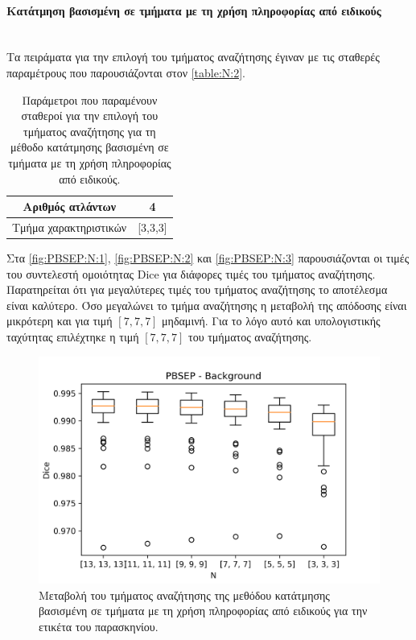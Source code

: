 \documentclass[a4paper,12pt]{article}
\newcommand{\paragraphLine}[1]{\paragraph{#1}\mbox{}\\}
\begin{document}
\paragraphLine{Κατάτμηση βασισμένη σε τμήματα με τη χρήση πληροφορίας από
               ειδικούς}

Τα πειράματα για την επιλογή του τμήματος αναζήτησης έγιναν με τις σταθερές
παραμέτρους που παρουσιάζονται στον \autoref{table:N:2}.

\begin{table}[h!]
    \centering
    \begin{tabular}{|c|c|} 
        \hline
        Αριθμός ατλάντων & 4 \\ 
        \hline
        Τμήμα χαρακτηριστικών & [3,3,3] \\ 
        \hline
    \end{tabular}
    \caption{Παράμετροι που παραμένουν σταθεροί για την επιλογή του τμήματος
             αναζήτησης για τη μέθοδο κατάτμησης βασισμένη σε τμήματα με τη
             χρήση πληροφορίας από ειδικούς.}
    \label{table:N:2}
\end{table}

Στα \autoref{fig:PBSEP:N:1}, \autoref{fig:PBSEP:N:2} και \autoref{fig:PBSEP:N:3}
παρουσιάζονται οι τιμές του συντελεστή ομοιότητας Dice για διάφορες τιμές του
τμήματος αναζήτησης. Παρατηρείται ότι για μεγαλύτερες τιμές του τμήματος
αναζήτησης το αποτέλεσμα είναι καλύτερο. Όσο μεγαλώνει το τμήμα αναζήτησης η
μεταβολή της απόδοσης είναι μικρότερη και για τιμή $[7,7,7]$ μηδαμινή. Για το
λόγο αυτό και υπολογιστικής ταχύτητας επιλέχτηκε η τιμή $[7,7,7]$ του τμήματος
αναζήτησης.

\begin{figure}[H]
    \centering
    \includegraphics[width=0.85\linewidth]{PBSEP_N_Background_plot.png}
    \caption{Μεταβολή του τμήματος αναζήτησης της μεθόδου κατάτμησης βασισμένη
             σε τμήματα με τη χρήση πληροφορίας από ειδικούς για την ετικέτα του
             παρασκηνίου.}
    \label{fig:PBSEP:N:1}
\end{figure}
\end{document}
